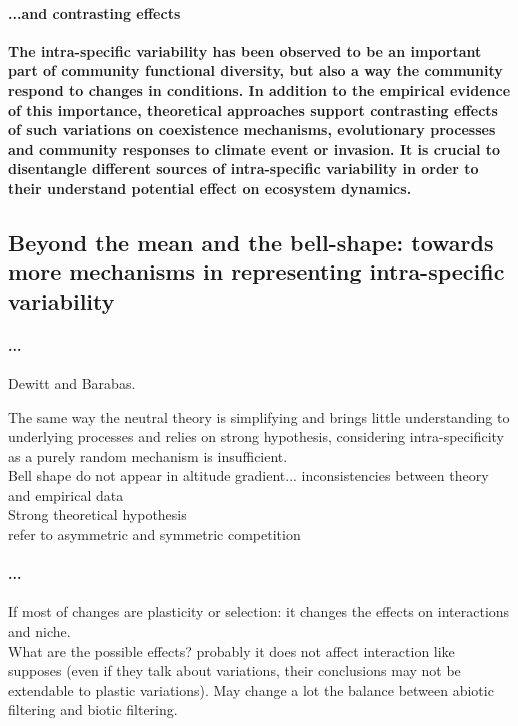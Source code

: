\paragraph{...and contrasting effects}

\parencite{hart_how_2016}
\parencite{courbaud_intra-specific_2010}
\parencite{turcotte_phenotypic_2016}
\parencite{roscher_contrasting_2015}
\parencite{valladares_species_2015}
\parencite{barabas_effect_2016}
\parencite{jung_intraspecific_2010}


\textbf{The intra-specific variability has been observed to be an important part of community functional diversity, but also a way the community respond to changes in conditions. In addition to the empirical evidence of this importance, theoretical approaches support contrasting effects of such variations on coexistence mechanisms, evolutionary processes and community responses to climate event or invasion. It is crucial to disentangle different sources of intra-specific variability in order to their understand potential effect on ecosystem dynamics.}

\subsection{Beyond the mean and the bell-shape: towards more mechanisms in representing intra-specific variability}

\paragraph{...}
Dewitt and Barabas.

The same way the neutral theory is simplifying and brings little understanding to underlying processes and relies on strong hypothesis, considering intra-specificity as a purely random mechanism is insufficient.\\
Bell shape do not appear in altitude gradient... inconsistencies between theory and empirical data\\
Strong theoretical hypothesis\\
refer to asymmetric and symmetric competition\\

\paragraph{...}
If most of changes are plasticity or selection: it changes the effects on interactions and niche.\\
What are the possible effects? probably it does not affect interaction like \parencite{hart_how_2016} supposes (even if they talk about variations, their conclusions may not be extendable to plastic variations). May change a lot the balance between abiotic filtering and biotic filtering. 

